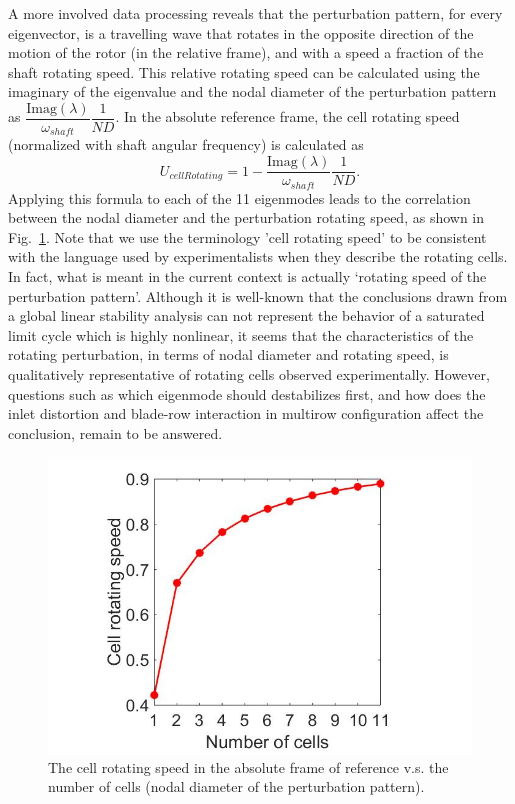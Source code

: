\documentclass[journal,final]{new-aiaa}
\begin{document}
A more involved data processing reveals that the perturbation pattern,
for every eigenvector, is a travelling wave that rotates in the opposite
direction of the motion of the rotor (in the relative frame), and with a speed a fraction of the
shaft rotating speed. This relative rotating speed can be
calculated using the imaginary of the eigenvalue and the nodal diameter
of the perturbation pattern as $\dfrac{\text{Imag}(\lambda)}{\omega_{shaft}} \dfrac{1}{ND}$.
In the absolute reference frame, the cell rotating speed (normalized
with shaft angular frequency) is calculated as
\begin{equation}\label{cellrotspd}
U_{cellRotating}= 1-\dfrac{\text{Imag}(\lambda)}{\omega_{shaft}} \dfrac{1}{ND}.
\end{equation}
Applying this formula to each of the 11 eigenmodes leads to the
correlation between the nodal diameter and the perturbation rotating speed, as shown in Fig.~\ref{fig:r67-eigenvector-18kpa}. Note that we use the terminology 'cell rotating speed'
to be consistent with the language used by experimentalists when they describe
the rotating cells. In fact, what is meant in the current context is actually
`rotating speed of the perturbation pattern'.
Although it is well-known that the conclusions drawn from a global linear
stability analysis can not represent the behavior of a saturated limit cycle
which is highly nonlinear, it seems that the characteristics of the
rotating perturbation,
in terms of nodal diameter and rotating speed, is qualitatively representative
of rotating cells observed experimentally. However, questions such as which eigenmode
should destabilizes first, and how does the inlet distortion and blade-row interaction in
multirow configuration affect the conclusion, remain to be answered.

\begin{figure}[htb]
	\centering   
{\tiny }	\includegraphics[width=.4\textwidth]{pic/speed-vs-nd.jpg}
	\caption{The cell rotating speed in the absolute frame of reference v.s. the number of cells (nodal diameter of the perturbation pattern).}
	\label{fig:r67-eigenvector-18kpa}
\end{figure}
\end{document}
